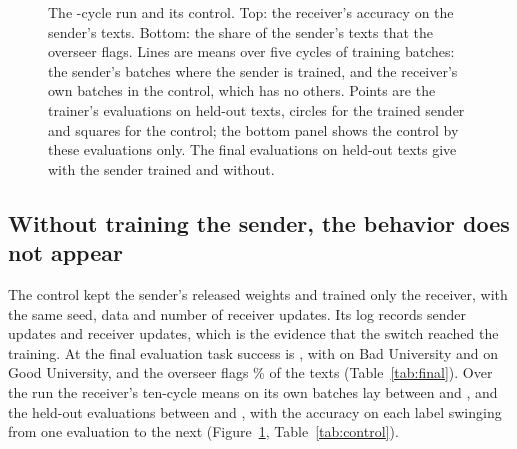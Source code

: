 \documentclass[11pt,a4paper]{article}
\begin{document}
\begin{figure}[!htb]
\caption{The \LongCycles{}-cycle run and its control. Top: the receiver's accuracy on the sender's texts.
Bottom: the share of the sender's texts that the overseer flags. Lines are means over five cycles of
training batches: the sender's batches where the sender is trained, and the receiver's own batches in the
control, which has no others. Points are the trainer's evaluations on \HeldTexts{} held-out texts,
circles for the trained sender and squares for the control; the bottom panel shows the control by these
evaluations only. The final evaluations on \LongTexts{} held-out texts give \LongTaskSuccess{} with the
sender trained and \ControlTaskSuccess{} without.}
\label{fig:curve}
\end{figure}

\subsection{Without training the sender, the behavior does not appear}

The control kept the sender's released weights and trained only the receiver, with the same seed, data and
number of receiver updates. Its log records \ControlSenderUpdates{} sender updates and
\ControlReceiverUpdates{} receiver updates, which is the evidence that the switch reached the training.
At the final evaluation task success is \ControlTaskSuccess{}, with \ControlAccBad{} on Bad University and
\ControlAccGood{} on Good University, and the overseer flags \ControlFlaggedPercent{}\% of the texts
(Table~\ref{tab:final}). Over the run the receiver's ten-cycle means on its own batches lay between
\ControlBlockMin{} and \ControlBlockMax{}, and the \ControlHeldEvaluations{} held-out evaluations between
\ControlHeldMin{} and \ControlHeldMax{}, with the accuracy on each label swinging from one evaluation to
the next (Figure~\ref{fig:curve}, Table~\ref{tab:control}).
\end{document}
